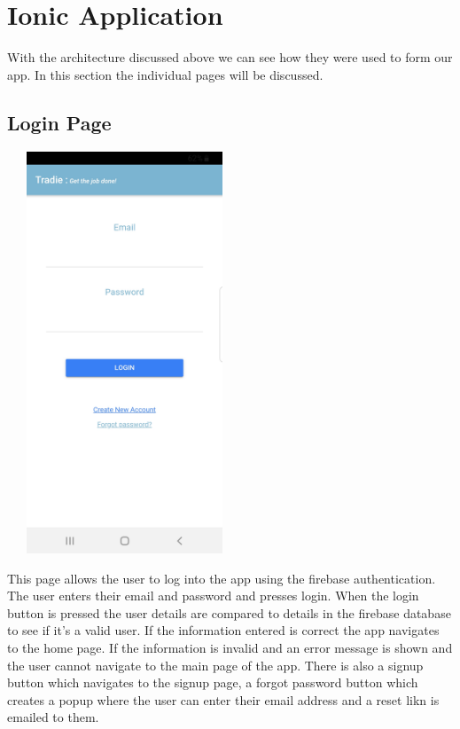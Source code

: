 \section{Ionic Application}
With the architecture discussed above we can see how they were used to form our app. In this section the individual pages will be discussed.
\subsection{Login Page}
\begin{center}    
	\includegraphics[width=7cm, height=12cm]{img/login.jpg}
\end{center}
This page allows the user to log into the app using the firebase authentication. The user enters their email and password and presses login. When the login button is pressed the user details are compared to details in the firebase database to see if it’s a valid user. If the information entered is correct the app navigates to the home page. If the information is invalid and an error message is shown and the user cannot navigate to the main page of the app. There is also a signup button which navigates to the signup page, a forgot password button which creates a popup where the user can enter their email address and a reset likn is emailed to them.
